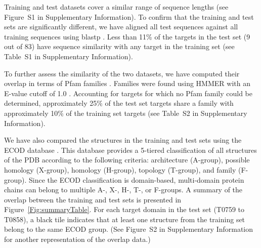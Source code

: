\documentclass{bioinfo}
\begin{document}
Training and test datasets cover a similar range of sequence
lengths (see Figure~S1 in Supplementary Information). To confirm that the
training and test sets are significantly different, we have aligned
all test sequences against all training sequences using
blastp \citep{altschul1990basic}.  Less than 11\% of the targets in the
test set (9 out of 83) have sequence similarity with any target in the
training set (see Table~S1 in Supplementary Information).

To further assess the similarity of the two datasets, we have computed
their overlap in terms of Pfam families \citep{finn2016pfam}. 
Families were found using HMMER \citep{finn2015hmmer} with an E-value
cutoff of 1.0 \citep{finn2016pfam}.  Accounting for targets for which
no Pfam family could be determined, approximately 25\% of the test set
targets share a family with approximately 10\% of the training set
targets (see Table~S2 in Supplementary Information).

We have also compared the structures in the training and test sets
using the ECOD database \citep{cheng2014ecod}. This database provides a
5-tiered classification of all structures of the PDB
\citep{berman2000protein} according to the following criteria:
architecture (A-group), possible homology (X-group), homology
(H-group), topology (T-group), and family (F-group).  Since the ECOD
classification is domain-based, multi-domain protein chains can belong
to multiple A-, X-, H-, T-, or F-groups.
%
A summary of the overlap between the training and test sets is
presented in Figure~\ref{Fig:summaryTable}. For each target domain in
the test set (T0759 to T0858), a black tile indicates that at least
one structure from the training set belong to the same ECOD
group. (See Figure~S2 in Supplementary Information for another
representation of the overlap data.)
\end{document}
